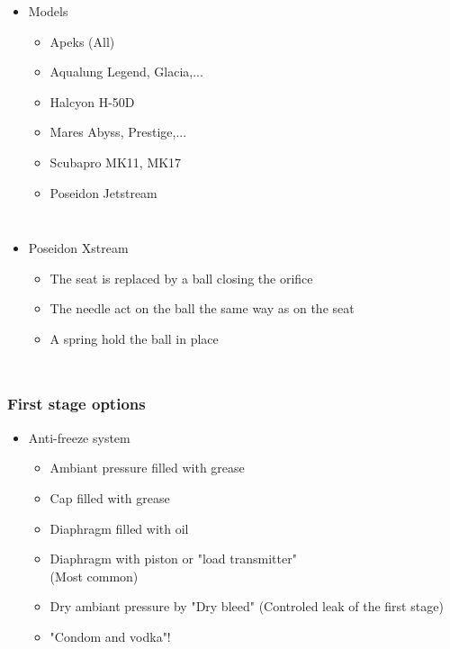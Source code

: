 \documentclass[aspectratio=1610,english,12pt]{beamer}
\begin{document}
\begin{frame}{\insertsubsubsection}
	\begin{itemize}
		\item Models
		\begin{itemize}
			\item Apeks (All)
			\item Aqualung Legend, Glacia,...
			\item Halcyon H-50D
			\item Mares Abyss, Prestige,...
			\item Scubapro MK11, MK17
			\item Poseidon Jetstream
		\end{itemize}
	\end{itemize}
\end{frame}

\begin{frame}{\insertsubsubsection}
	\begin{columns}[onlytextwidth]
			\begin{itemize}
				\item Poseidon Xstream
				\begin{itemize}
					\item The seat is replaced by a ball closing the orifice
					\item The needle act on the ball the same way as on the seat
					\item A spring hold the ball in place
				\end{itemize}
			\end{itemize}
	\end{columns}
\end{frame}

\subsubsection{First stage options}
\begin{frame}{\insertsubsubsection}
	\begin{itemize}
		\item Anti-freeze system
		\begin{itemize}
			\item Ambiant pressure filled with grease
			\item Cap filled with grease
			\item Diaphragm filled with oil
			\item Diaphragm with piston or "load transmitter" \\ (Most common)
			\item Dry ambiant pressure by "Dry bleed" (Controled leak of the first stage)
			\item "Condom and vodka"!
		\end{itemize}
	\end{itemize}
\end{frame}
\end{document}
